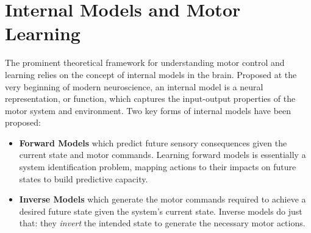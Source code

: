 \documentclass[../main.tex]{subfiles}
\begin{document}










\section{Internal Models and Motor Learning}

The prominent theoretical framework for understanding motor control and learning relies on the concept of internal models in the brain. Proposed at the very beginning of modern neuroscience, an internal model is a neural representation, or function, which captures the input-output properties of the motor system and environment\cite{craikNatureExplanation1967}. Two key forms of internal models have been proposed:

\begin{itemize}
    \item \textbf{Forward Models} which predict future sensory consequences given the current state and motor commands. Learning forward models is essentially a system identification problem, mapping actions to their impacts on future states to build predictive capacity.
    \item \textbf{Inverse Models} which generate the motor commands required to achieve a desired future state given the system's current state. Inverse models do just that: they \textit{invert} the intended state to generate the necessary motor actions.
\end{itemize}
\end{document}
